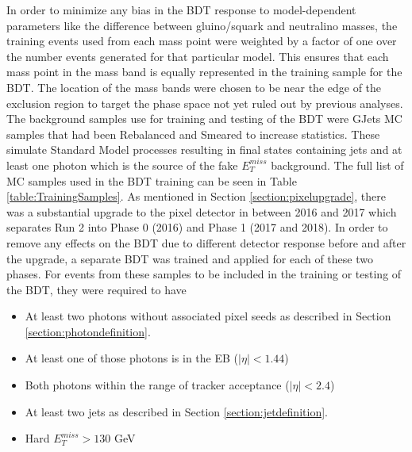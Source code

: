 In order to minimize any bias in the BDT response to  model-dependent parameters like the difference between gluino/squark and neutralino masses, the training events used from each mass point were weighted by a factor of one over the number events generated for that particular model.  This ensures that each mass point in the mass band is equally represented in the training sample for the BDT.  The location of the mass bands were chosen to be near the edge of the exclusion region to target the phase space not yet ruled out by previous analyses.  The background samples use for training and testing of the BDT were GJets MC samples that had been Rebalanced and Smeared to increase statistics. These simulate Standard Model processes resulting in final states containing jets and at least one photon which is the source of the fake $E^{miss}_T$ background.  The full list of MC samples used in the BDT training can be seen in Table \ref{table:TrainingSamples}.  As mentioned in Section \ref{section:pixelupgrade}, there was a substantial upgrade to the pixel detector in between 2016 and 2017 which separates Run 2 into Phase 0 (2016) and Phase 1 (2017 and 2018).  In order to remove any effects on the BDT due to different detector response before and after the upgrade, a separate BDT was trained and applied for each of these two phases.  For events from these samples to be included in the training or testing of the BDT, they were required to have
\begin{itemize}
	\item At least two photons without associated pixel seeds as described in Section \ref{section:photondefinition}.
	\item At least one of those photons is in the EB ($|\eta|<1.44$)
	\item Both photons within the range of tracker acceptance ($|\eta|<2.4$)
	\item At least two jets as described in Section \ref{section:jetdefinition}.
	\item Hard $E^{miss}_T>130$ GeV
\end{itemize}

